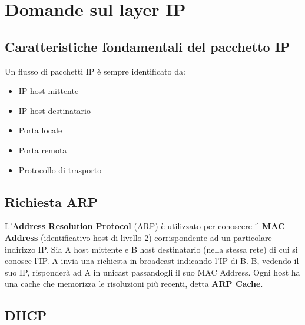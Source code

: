 \documentclass[12pt]{article}
\begin{document}
\section{Domande sul layer IP}

\subsection{Caratteristiche fondamentali del pacchetto IP}

Un flusso di pacchetti IP è sempre identificato da:
\begin{itemize}
    \item IP host mittente
    \item IP host destinatario
    \item Porta locale
    \item Porta remota
    \item Protocollo di trasporto
\end{itemize}

\subsection{Richiesta ARP}

L'\textbf{Address Resolution Protocol} (ARP) è utilizzato per conoscere il \textbf{MAC Address} (identificativo host di livello 2) corrispondente ad un particolare indirizzo IP. Sia A host mittente e B host destinatario (nella stessa rete) di cui si conosce l'IP. A invia una richiesta in broadcast indicando l'IP di B. B, vedendo il suo IP, risponderà ad A in unicast passandogli il suo MAC Address. Ogni host ha una cache che memorizza le risoluzioni più recenti, detta \textbf{ARP Cache}.

\subsection{DHCP}
\end{document}
